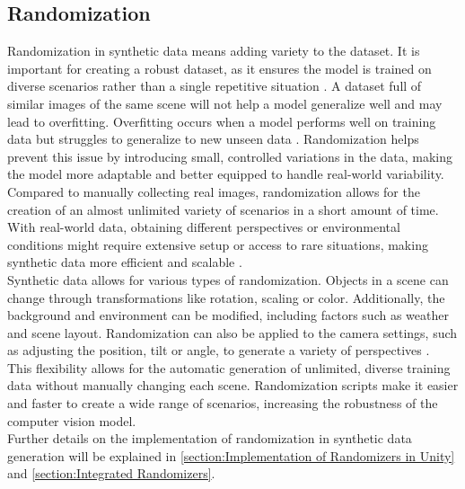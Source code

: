 \subsection{Randomization}
Randomization in synthetic data means adding variety to the dataset. It is important for creating a robust dataset, as it ensures the model is trained on diverse scenarios rather than a single repetitive situation \cite{borkman2021unityperceptiongeneratesynthetic}. A dataset full of similar images of the same scene will not help a model generalize well and may lead to overfitting. Overfitting occurs when a model performs well on training data but struggles to generalize to new unseen data \cite{Ying_2019}. Randomization helps prevent this issue by introducing small, controlled variations in the data, making the model more adaptable and better equipped to handle real-world variability.\\

\noindent Compared to manually collecting real images, randomization allows for the creation of an almost unlimited variety of scenarios in a short amount of time. With real-world data, obtaining different perspectives or environmental conditions might require extensive setup or access to rare situations, making synthetic data more efficient and scalable \cite{borkman2021unityperceptiongeneratesynthetic}. \\

\noindent Synthetic data allows for various types of randomization. Objects in a scene can change through transformations like rotation, scaling or color. Additionally, the background and environment can be modified, including factors such as weather and scene layout. Randomization can also be applied to the camera settings, such as adjusting the position, tilt or angle, to generate a variety of perspectives \cite{borkman2021unityperceptiongeneratesynthetic}.\\

\noindent This flexibility allows for the automatic generation of unlimited, diverse training data without manually changing each scene. Randomization scripts make it easier and faster to create a wide range of scenarios, increasing the robustness of the computer vision model.\\

\noindent Further details on the implementation of randomization in synthetic data generation will be explained in \ref{section:Implementation of Randomizers in Unity} and \ref{section:Integrated Randomizers}.


